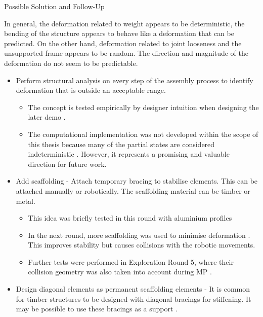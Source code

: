 Possible Solution and Follow-Up

In general, the deformation related to weight appears to be deterministic, the bending of the structure appears to behave like a deformation that can be predicted. On the other hand, deformation related to joint looseness and the unsupported frame appears to be random. The direction and magnitude of the deformation do not seem to be predictable.
\begin{itemize}
    \item Perform structural analysis on every step of the assembly process to identify deformation that is outside an acceptable range.
    \begin{itemize}
        \item The concept is tested empirically by designer intuition when designing the later demo .
        \item The computational implementation was not developed within the scope of this thesis because many of the partial states are considered indeterministic . However, it represents a promising and valuable direction for future work.
    \end{itemize}
    \item Add scaffolding - Attach temporary bracing to stabilise elements. This can be attached manually or robotically. The scaffolding material can be timber or metal. 
    \begin{itemize}
        \item This idea was briefly tested in this round with aluminium profiles
        \item In the next round, more scaffolding was used to minimise deformation . This improves stability but causes collisions with the robotic movements. 
        \item Further tests were performed in Exploration Round 5, where their collision geometry was also taken into account during MP . 
    \end{itemize}
    \item Design diagonal elements as permanent scaffolding elements - It is common for timber structures to be designed with diagonal bracings for stiffening. It may be possible to use these bracings as a support .

\end{itemize}
